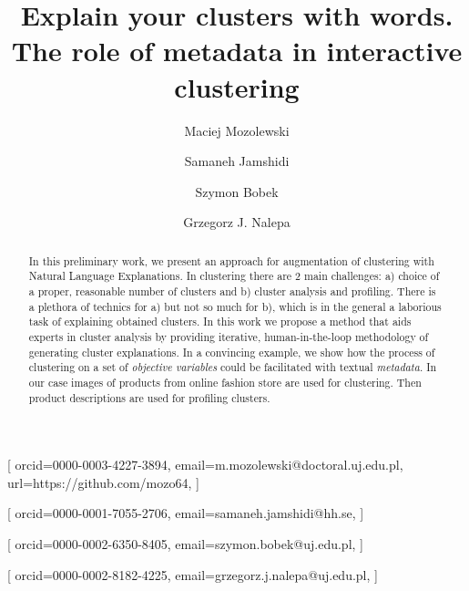 \documentclass[
 twocolumn,
 hf,
]{ceurart}
\begin{document}
\title{Explain your clusters with words. The role of metadata in interactive clustering}

\author[1]{Maciej Mozolewski}[
orcid=0000-0003-4227-3894,
email=m.mozolewski@doctoral.uj.edu.pl,
url=https://github.com/mozo64,
]

\author[2]{Samaneh Jamshidi}[
orcid=0000-0001-7055-2706,
email=samaneh.jamshidi@hh.se,
]

\author[1]{Szymon Bobek}[
orcid=0000-0002-6350-8405,
email=szymon.bobek@uj.edu.pl,
]

\author[1]{Grzegorz J. Nalepa}[
orcid=0000-0002-8182-4225,
email=grzegorz.j.nalepa@uj.edu.pl,
]

\address[1]{Jagiellonian Human-Centered Artificial Intelligence Laboratory (JAHCAI) and Institute of Applied Computer Science, Jagiellonian University, Cracow, Poland}
\address[2]{Center for Applied Intelligent Systems Research (CAISR), Halmstad University, Halmstad, Sweden}




\begin{abstract}
  In this preliminary work, we present an approach for augmentation of clustering  with Natural Language Explanations.
  In clustering there are 2 main challenges: a) choice of a proper, reasonable number of clusters and b) cluster analysis and profiling.
  There is a plethora of technics for a) but not so much for b), which is in the general a laborious task of explaining obtained clusters.
  In this work we propose a method that aids experts in cluster analysis by providing iterative, human-in-the-loop methodology of generating cluster explanations.
  In a convincing example, we show how the process of clustering on a set of \textit{objective variables} could be facilitated with textual \textit{metadata}.
  In our case images of products from online fashion store are used for clustering.
  Then product descriptions are used for profiling clusters.
\end{abstract}
\end{document}
